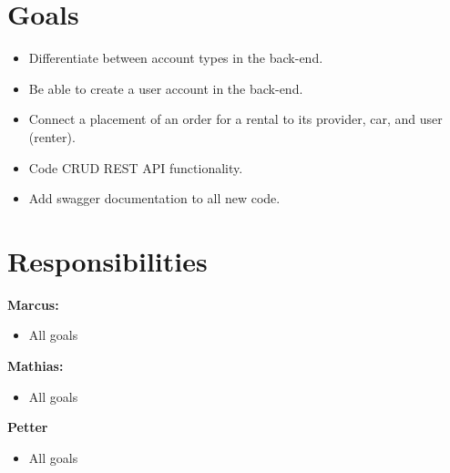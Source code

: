 \documentclass[a4paper,12pt]{article}
\begin{document}
\section{\textbf{Goals}}
\begin{itemize}
    \item Differentiate between account types in the back-end.
    \item Be able to create a user account in the back-end.
    \item Connect a placement of an order for a rental to its provider, car, and user (renter).
    \item Code CRUD REST API functionality.
    \item Add swagger documentation to all new code.
\end{itemize}

\section{Responsibilities}
\textbf{Marcus:}
\begin{itemize}
    \item All goals
\end{itemize}
\textbf{Mathias:}
\begin{itemize}
    \item     All goals
\end{itemize}
\textbf{Petter}
\begin{itemize}
    \item     All goals
\end{itemize}
\end{document}
